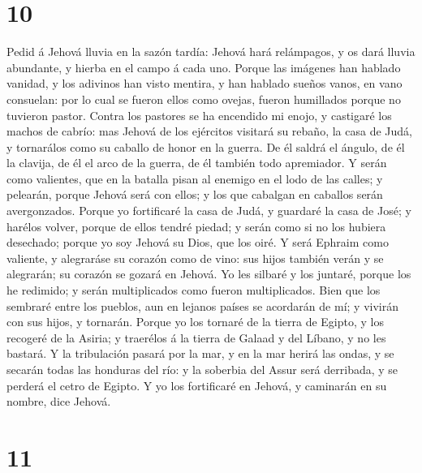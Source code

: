 \hypertarget{section-9}{%
\section{10}\label{section-9}}

 Pedid á Jehová lluvia en la sazón tardía: Jehová hará
relámpagos, y os dará lluvia abundante, y hierba en el campo á cada uno.
 Porque las imágenes han hablado vanidad, y los adivinos han
visto mentira, y han hablado sueños vanos, en vano consuelan: por lo
cual se fueron ellos como ovejas, fueron humillados porque no tuvieron
pastor.  Contra los pastores se ha encendido mi enojo, y
castigaré los machos de cabrío: mas Jehová de los ejércitos visitará su
rebaño, la casa de Judá, y tornarálos como su caballo de honor en la
guerra.  De él saldrá el ángulo, de él la clavija, de él el
arco de la guerra, de él también todo apremiador.  Y serán
como valientes, que en la batalla pisan al enemigo en el lodo de las
calles; y pelearán, porque Jehová será con ellos; y los que cabalgan en
caballos serán avergonzados.  Porque yo fortificaré la casa
de Judá, y guardaré la casa de José; y harélos volver, porque de ellos
tendré piedad; y serán como si no los hubiera desechado; porque yo soy
Jehová su Dios, que los oiré.  Y será Ephraim como valiente,
y alegraráse su corazón como de vino: sus hijos también verán y se
alegrarán; su corazón se gozará en Jehová.  Yo les silbaré y
los juntaré, porque los he redimido; y serán multiplicados como fueron
multiplicados.  Bien que los sembraré entre los pueblos, aun
en lejanos países se acordarán de mí; y vivirán con sus hijos, y
tornarán.  Porque yo los tornaré de la tierra de Egipto, y
los recogeré de la Asiria; y traerélos á la tierra de Galaad y del
Líbano, y no les bastará.  Y la tribulación pasará por la
mar, y en la mar herirá las ondas, y se secarán todas las honduras del
río: y la soberbia del Assur será derribada, y se perderá el cetro de
Egipto.  Y yo los fortificaré en Jehová, y caminarán en su
nombre, dice Jehová.

\hypertarget{section-10}{%
\section{11}\label{section-10}}

